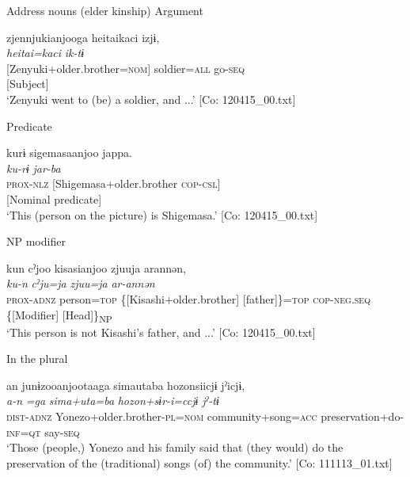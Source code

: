 \ea \label{ex:7:6}  Address nouns (elder kinship)
\ea \label{ex:7:6a}Argument

{\TM}
\gllll  zjennjukianjooga  {\textbar}heitai{\textbar}kaci  izjɨ,\\
\textit{}  \textit{heitai=kaci}  \textit{ik-tɨ}\\
{}[Zenyuki+older.brother=\textsc{nom}]  soldier=\textsc{all}  go-\textsc{seq}\\
{}[Subject]    \\
\glt ‘Zenyuki went to (be) a soldier, and ...’ [Co: 120415\_00.txt]

\ex \label{ex:7:6b}Predicate

{\TM}
\gllll  kurɨ  sigemasaanjoo  jappa.\\
\textit{ku-rɨ}  \textit{}  \textit{jar-ba}\\
\textsc{prox}-\textsc{nlz}  [Shigemasa+older.brother  \textsc{cop}-\textsc{csl}]\\
{}[Nominal predicate]  \\
\glt ‘This (person on the picture) is Shigemasa.’ [Co: 120415\_00.txt]

\ex \label{ex:7:6c}NP modifier

  {\TM}
\glll kun  cˀjoo  kisasianjoo  zjuuja  arannən,\\
\textit{ku-n}  \textit{cˀju=ja}  \textit{}  \textit{zjuu=ja} \textit{ar-annən}\\
      \textsc{prox}-\textsc{adnz}  person=\textsc{top}  \{[Kisashi+older.brother]  [father]\}=\textsc{top}         \textsc{cop}-\textsc{neg}.\textsc{seq}\\
          \{[Modifier]  [Head]\}\textsubscript{NP}\\
\glt    ‘This person is not Kisashi’s father, and ...’       [Co: 120415\_00.txt]

\ex \label{ex:7:6d}In the plural

{\TM}
\glll an  junɨzooanjootaaga  simautaba hozonsiicjɨ  jˀicjɨ,\\
\textit{a-n}  \textit{=ga}  \textit{sima+uta=ba}  \textit{hozon+sɨr-i=ccjɨ}  \textit{jˀ-tɨ}\\
      \textsc{dist}-\textsc{adnz}  Yonezo+older.brother-\textsc{pl}=\textsc{nom}  community+song=\textsc{acc}         preservation+do-\textsc{inf}=\textsc{qt}  say-\textsc{seq}\\
\glt    ‘Those (people,) Yonezo and his family said that (they would) do the preservation of the (traditional) songs (of) the community.’      [Co: 111113\_01.txt]

